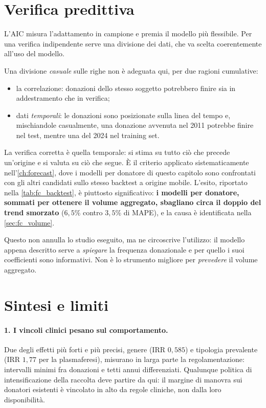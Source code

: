 \section{Verifica predittiva}
\label{sec:glm_holdout}

L'AIC misura l'adattamento in campione e premia il modello più flessibile. Per
una verifica indipendente serve una divisione dei dati, che va
scelta coerentemente all'uso del modello.

Una divisione \emph{casuale} sulle righe non è adeguata qui, per due
ragioni cumulative:
\begin{itemize}
    \item la correlazione: donazioni dello stesso soggetto potrebbero finire
 sia in addestramento che in verifica;
    \item dati \emph{temporali}: le donazioni sono posizionate sulla linea del tempo e,
mischiandole casualmente, una donazione avvenuta nel 2011 potrebbe finire nel test,
mentre una del 2024 nel training set.
\end{itemize}


La verifica corretta è quella temporale: si stima su tutto ciò che precede
un'origine e si valuta su ciò che segue. È il criterio applicato
sistematicamente nell'\cref{ch:forecast}, dove i modelli per donatore di questo
capitolo sono confrontati con gli altri candidati sullo stesso backtest a
origine mobile. L'esito, riportato nella \cref{tab:fc_backtest}, è piuttosto significativo:
\textbf{i modelli per donatore, sommati per ottenere il volume aggregato,
sbagliano circa il doppio del trend smorzato} ($6{,}5\%$ contro $3{,}5\%$ di
MAPE), e la causa è identificata nella \cref{sec:fc_volume}.

Questo non annulla lo studio eseguito, ma ne circoscrive l'utilizzo: il modello appena descritto
serve a \emph{spiegare} la frequenza donazionale e per quello i suoi
coefficienti sono informativi. Non è lo strumento migliore per \emph{prevedere}
il volume aggregato.

\section{Sintesi e limiti}
\label{sec:glm_summary}

\paragraph{1. I vincoli clinici pesano sul comportamento.}
Due degli effetti più forti e più precisi, genere (IRR $0{,}585$) e tipologia
prevalente (IRR $1{,}77$ per la plasmaferesi), misurano in larga parte la
regolamentazione: intervalli minimi fra donazioni e tetti annui differenziati.
Qualunque politica di intensificazione della raccolta deve partire da qui: il
margine di manovra sui donatori esistenti è vincolato in alto da regole
cliniche, non dalla loro disponibilità.

